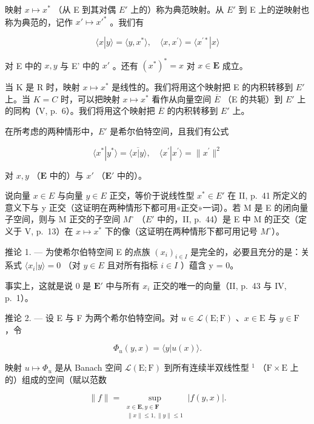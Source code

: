 映射 \(x \mapsto x^{*}\) （从 E 到其对偶 \(E'\) 上的）称为典范映射。从 \(E'\) 到 E 上的逆映射也称为典范的，记作 \(x' \mapsto x'^{*}\) 。我们有

\[
\langle x | y \rangle = \langle y, x ^ {*} \rangle , \quad \langle x, x ^ {\prime} \rangle = \langle x ^ {\prime *} | x \rangle\tag{17}
\]

对 E 中的 \(x, y\) 与 E' 中的 \(x'\) 。还有 \((x^{*})^{*} = x\) 对 \(x \in \mathbf{E}\) 成立。

当 K 是 R 时，映射 \(x \mapsto x^{*}\) 是线性的。我们将用这个映射把 E 的内积转移到 \(E'\) 上。当 \(K = C\) 时，可以把映射 \(x \mapsto x^{*}\) 看作从向量空间 \(\overline{E}\) （E 的共轭）到 \(E'\) 上的同构（V, p.~6）。我们将用这个映射把 \(\overline{E}\) 的内积转移到 \(E'\) 上。

在所考虑的两种情形中，\(E'\) 是希尔伯特空间，且我们有公式

\[
\langle x ^ {*} | y ^ {*} \rangle = \overline {{\langle x | y \rangle}}, \quad \langle x ^ {\prime} | x ^ {\prime} \rangle = \| x ^ {\prime} \| ^ {2}
\]

对 \(x, y\) （\(\mathbf{E}\) 中的）与 \(x'\) （\(\mathbf{E}'\) 中的）。

说向量 \(x \in E\) 与向量 \(y \in E\) 正交，等价于说线性型 \(x^{*} \in E'\) 在 II, p.~41 所定义的意义下与 y 正交（这证明在两种情形下都可用«正交»一词）。若 M 是 E 的闭向量子空间，则与 M 正交的子空间 \(M^{\circ}\) （\(E'\) 中的，II, p.~44）是 E 中 M 的正交（定义于 V, p.~13）在 \(x \mapsto x^{*}\) 下的像（这证明在两种情形下都可用记号 \(M^{\circ}\)）。

推论 1. --- 为使希尔伯特空间 E 的点族 \((x_{i})_{i\in I}\) 是完全的，必要且充分的是：关系式 \(\langle x_{i}|y\rangle = 0\) （对 \(y \in E\) 且对所有指标 \(i \in I\) ）蕴含 y = 0。

事实上，这就是说 0 是 \(\mathbf{E}'\) 中与所有 \(x_{i}\) 正交的唯一的向量（II, p.~43 与 IV, p.~1）。

推论 2. --- 设 E 与 F 为两个希尔伯特空间。对 \(u \in \mathcal{L}(\mathrm{E};\mathrm{F})\) 、\(x \in \mathrm{E}\) 与 \(y \in \mathrm{F}\) ，令

\[
\Phi_ {u} (y, x) = \langle y | u (x) \rangle .\tag{18}
\]

映射 \(u \mapsto \Phi_u\) 是从 Banach 空间 \(\mathcal{L}(\mathrm{E};\mathrm{F})\) 到所有连续半双线性型 \(^1\) （\(\mathrm{F} \times \mathrm{E}\) 上的）组成的空间（赋以范数

\[
\| f\| = \sup_{\substack{x\in \mathbf{E},  y\in \mathbf{F}\\ \| x\| \leqslant 1, \| y\| \leqslant 1}}\left|f(y,x)\right|.\tag{19}
\]

